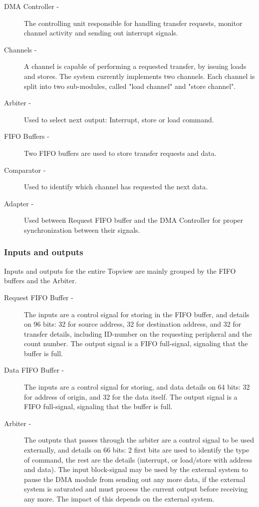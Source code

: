 \begin{appendix}
\begin{description}
    \item[DMA Controller -] 
    The controlling unit responsible for handling transfer requests, monitor channel activity and sending out interrupt signals.
    \item[Channels -] 
    A channel is capable of performing a requested transfer, by issuing loads and stores.
    The system currently implements two channels.
    Each channel is split into two sub-modules, called "load channel" and "store channel".
    \item[Arbiter -]
    Used to select next output: Interrupt, store or load command.     
    \item[FIFO Buffers -]
    Two FIFO buffers are used to store transfer requests and data.
    \item[Comparator -]
    Used to identify which channel has requested the next data.
    \item[Adapter -]
    Used between Request FIFO buffer and the DMA Controller for proper synchronization between their signals.  
\end{description}

\subsubsection{Inputs and outputs}
Inputs and outputs for the entire Topview are mainly grouped by the FIFO buffers and the Arbiter.
\begin{description}
    \item[Request FIFO Buffer -] 
    The inputs are a control signal for storing in the FIFO buffer, and details on 96 bits: 32 for source address, 32 for destination address, and 32 for transfer details, including ID-number on the requesting peripheral and the count number. 
    The output signal is a FIFO full-signal, signaling that the buffer is full.
    \item[Data FIFO Buffer -] 
    The inputs are a control signal for storing, and data details on 64 bits: 32 for address of origin, and 32 for the data itself.
    The output signal is a FIFO full-signal, signaling that the buffer is full.
    \item[Arbiter -]
    The outputs that passes through the arbiter are a control signal to be used externally, and details on 66 bits: 2 first bits are used to identify the type of command, the rest are the details (interrupt, or load/store with address and data).
    The input block-signal may be used by the external system to pause the DMA module from sending out any more data, if the external system is saturated and must process the current output before receiving any more. 
    The impact of this depends on the external system.
\end{description}


\end{appendix}
